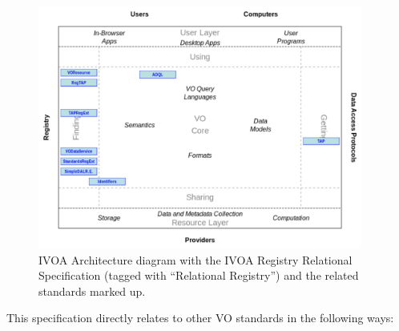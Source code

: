 \documentclass[11pt,a4paper]{ivoa}
\begin{document}
\begin{figure}[th]
\begin{center}
\includegraphics[width=0.95\textwidth]{role_diagram.pdf}
\end{center}

\caption{IVOA Architecture
diagram with the IVOA Registry Relational Specification (tagged with
``Relational Registry'') and the related standards marked up.}
\end{figure}

This specification directly relates to other VO standards in the
following ways:
\end{document}
